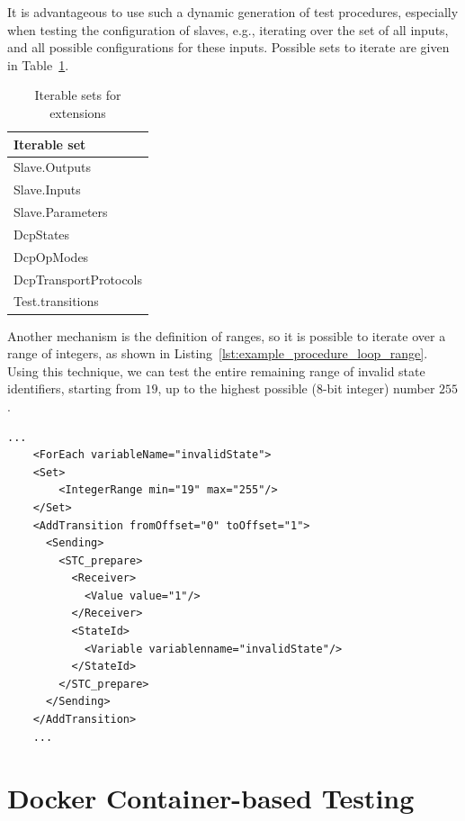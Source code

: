 \documentclass[a4paper]{scrartcl}
\theoremstyle{definition}
\begin{document}
It is advantageous to use such a dynamic generation of test procedures, especially when testing the configuration of slaves, e.g., iterating over the set of all inputs, and all possible configurations for these inputs.
Possible sets to iterate are given in Table~\ref{tab:iterableSets}.

\begin{table}[H]
\label{tab:iterableSets}
	\centering
		\begin{tabular}{l}
		\textbf{Iterable set} \\ \hline
			Slave.Outputs \\
			Slave.Inputs \\
			Slave.Parameters \\
			DcpStates \\
			DcpOpModes \\
			DcpTransportProtocols \\
			Test.transitions \\
		\end{tabular}
		\caption{Iterable sets for extensions}
\end{table}

Another mechanism is the definition of ranges, so it is possible to iterate over a range of integers, as shown in Listing~\ref{lst:example_procedure_loop_range}.
Using this technique, we can test the entire remaining range of invalid state identifiers, starting from $19$, up to the highest possible (8-bit integer) number $255$.

\begin{lstlisting}[caption=Snipped of extension showing a loop over a range, label=lst:example_procedure_loop_range]
    ...
    <ForEach variableName="invalidState">
    <Set>
        <IntegerRange min="19" max="255"/>
    </Set>
    <AddTransition fromOffset="0" toOffset="1">
      <Sending>
        <STC_prepare>
          <Receiver>
            <Value value="1"/>
          </Receiver>
          <StateId>
            <Variable variablenname="invalidState"/>
          </StateId>
        </STC_prepare>
      </Sending>
    </AddTransition>
    ...
\end{lstlisting}




\section{Docker Container-based Testing}
\label{sec:docker}
\end{document}
